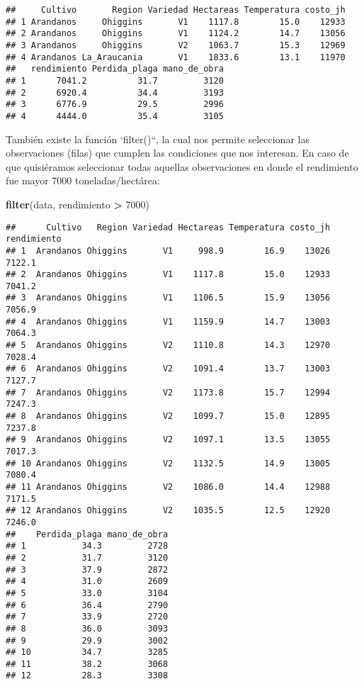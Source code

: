 \documentclass[]{book}
\newenvironment{Shaded}{\begin{snugshade}}{\end{snugshade}}
\newcommand{\DecValTok}[1]{\textcolor[rgb]{0.00,0.00,0.81}{#1}}
\newcommand{\KeywordTok}[1]{\textcolor[rgb]{0.13,0.29,0.53}{\textbf{#1}}}
\newcommand{\NormalTok}[1]{#1}
\newcommand{\OperatorTok}[1]{\textcolor[rgb]{0.81,0.36,0.00}{\textbf{#1}}}
\newcommand{\StringTok}[1]{\textcolor[rgb]{0.31,0.60,0.02}{#1}}
\begin{document}
\begin{verbatim}
##     Cultivo       Region Variedad Hectareas Temperatura costo_jh
## 1 Arandanos     Ohiggins       V1    1117.8        15.0    12933
## 2 Arandanos     Ohiggins       V1    1124.2        14.7    13056
## 3 Arandanos     Ohiggins       V2    1063.7        15.3    12969
## 4 Arandanos La_Araucania       V1    1833.6        13.1    11970
##   rendimiento Perdida_plaga mano_de_obra
## 1      7041.2          31.7         3120
## 2      6920.4          34.4         3193
## 3      6776.9          29.5         2996
## 4      4444.0          35.4         3105
\end{verbatim}

También existe la función `filter()``, la cual nos permite seleccionar las observaciones (filas) que cumplen las
condiciones que nos interesan. En caso de que quisiéramos seleccionar todas aquellas observaciones en donde el rendimiento fue mayor 7000 toneladas/hectárea:

\begin{Shaded}
\begin{Highlighting}[]
\KeywordTok{filter}\NormalTok{(data, rendimiento }\OperatorTok{>}\StringTok{ }\DecValTok{7000}\NormalTok{)}
\end{Highlighting}
\end{Shaded}

\begin{verbatim}
##      Cultivo   Region Variedad Hectareas Temperatura costo_jh rendimiento
## 1  Arandanos Ohiggins       V1     998.9        16.9    13026      7122.1
## 2  Arandanos Ohiggins       V1    1117.8        15.0    12933      7041.2
## 3  Arandanos Ohiggins       V1    1106.5        15.9    13056      7056.9
## 4  Arandanos Ohiggins       V1    1159.9        14.7    13003      7064.3
## 5  Arandanos Ohiggins       V2    1110.8        14.3    12970      7028.4
## 6  Arandanos Ohiggins       V2    1091.4        13.7    13003      7127.7
## 7  Arandanos Ohiggins       V2    1173.8        15.7    12994      7247.3
## 8  Arandanos Ohiggins       V2    1099.7        15.0    12895      7237.8
## 9  Arandanos Ohiggins       V2    1097.1        13.5    13055      7017.3
## 10 Arandanos Ohiggins       V2    1132.5        14.9    13005      7080.4
## 11 Arandanos Ohiggins       V2    1086.0        14.4    12988      7171.5
## 12 Arandanos Ohiggins       V2    1035.5        12.5    12920      7246.0
##    Perdida_plaga mano_de_obra
## 1           34.3         2728
## 2           31.7         3120
## 3           37.9         2872
## 4           31.0         2609
## 5           33.0         3104
## 6           36.4         2790
## 7           33.9         2720
## 8           36.0         3093
## 9           29.9         3002
## 10          34.7         3285
## 11          38.2         3068
## 12          28.3         3308
\end{verbatim}
\end{document}
